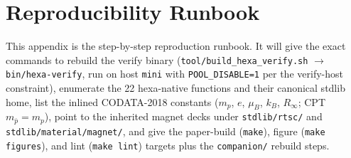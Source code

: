 \section{Reproducibility Runbook}
\label{app:repro}

This appendix is the step-by-step reproduction runbook. It will give the
exact commands to rebuild the verify binary
(\texttt{tool/build\_hexa\_verify.sh} $\to$ \texttt{bin/hexa-verify}, run on
host \texttt{mini} with \texttt{POOL\_DISABLE=1} per the verify-host
constraint), enumerate the 22 hexa-native functions and their canonical
stdlib home, list the inlined CODATA-2018 constants
\citep{mohr2018codata} ($m_p$, $e$, $\mu_B$, $k_B$, $R_\infty$; CPT
$m_{\bar p}=m_p$), point to the inherited magnet decks under
\texttt{stdlib/rtsc/} and \texttt{stdlib/material/magnet/}, and give the
paper-build (\texttt{make}), figure (\texttt{make figures}), and lint
(\texttt{make lint}) targets plus the \texttt{companion/} rebuild steps.

